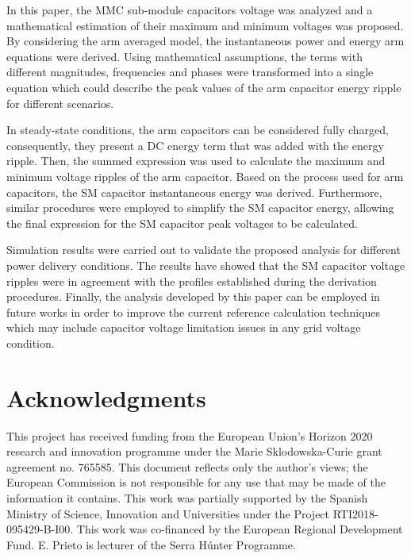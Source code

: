 \documentclass[journal]{IEEEtran}
\begin{document}
In this paper, the MMC sub-module capacitors voltage was analyzed and a mathematical estimation of their maximum and minimum voltages was proposed. By considering the arm averaged model, the instantaneous power and energy arm equations were derived. Using mathematical assumptions, the terms with different magnitudes, frequencies and phases were transformed into a single equation which could describe the peak values of the arm capacitor energy ripple for different scenarios.

In steady-state conditions, the arm capacitors can be considered fully charged, consequently, they present a DC energy term that was added with the energy ripple. Then, the summed expression was used to calculate the maximum and minimum voltage ripples of the arm capacitor. Based on the process used for arm capacitors, the SM capacitor instantaneous energy was derived. Furthermore, similar procedures were employed to simplify the SM capacitor energy, allowing the final expression for the SM capacitor peak voltages to be calculated. 

Simulation results were carried out to validate the proposed analysis for different power delivery conditions. The results have showed that the SM capacitor voltage ripples were in agreement with the profiles established during the derivation procedures. Finally, the analysis developed by this paper can be employed in future works in order to improve the current reference calculation techniques which may include capacitor voltage limitation issues in any grid voltage condition.

\section{Acknowledgments}
This project has received funding from the European Union's Horizon 2020 research and innovation programme under the Marie Sklodowska-Curie grant agreement no. 765585. This document reflects only the author’s views; the European Commission is not responsible for any use that may be made of the information it contains. This work was partially supported by the Spanish Ministry of Science, Innovation and Universities under the Project RTI2018-095429-B-I00. This work was co-financed by the European Regional Development Fund. E. Prieto is lecturer of the Serra H\'unter Programme.

\ifCLASSOPTIONcaptionsoff
  \newpage
\fi
\end{document}
